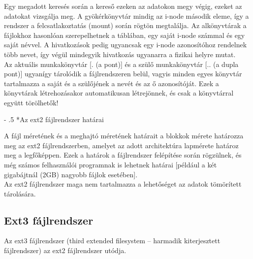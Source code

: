 \documentclass[tikz,12pt,margin=0px]{article}
\makeatletter
\renewcommand\paragraph{%
	\@startsection{paragraph}{4}{0mm}%
	{-\baselineskip}%
	{.5\baselineskip}%
	{\normalfont\normalsize\bfseries}}
\makeatother
\begin{document}
    \noindent Egy megadott keresés során a kereső ezeken az adatokon megy végig, ezeket az adatokat vizsgálja meg. A gyökérkönyvtár mindig az i-node második eleme, így a rendszer a felcsatlakoztatás (mount) során rögtön megtalálja. Az alkönyvtárak a fájlokhoz hasonlóan szerepelhetnek a táblában, egy saját i-node számmal és egy saját névvel. A hivatkozások pedig ugyancsak egy i-node azonosítóhoz rendelnek több nevet, így végül mindegyik hivatkozás ugyanarra a fizikai helyre mutat.\\

    \noindent Az aktuális munkakönyvtár [. (a pont)] és a szülő munkakönyvtár [.. (a dupla pont)] ugyanígy tárolódik a fájlrendszeren belül, vagyis minden egyes könyvtár tartalmazza a saját és a szülőjének a nevét és az ő azonosítóját. Ezek a könyvtárak létrehozásakor automatikusan létrejönnek, és csak a könyvtárral együtt törölhetők!

    \paragraph*{Az ext2 fájlrendszer határai}

    \noindent A fájl méretének és a meghajtó méretének határait a blokkok mérete határozza meg az ext2 fájlrendszerben, amelyet az adott architektúra lapmérete határoz meg a legfőképpen. Ezek a határok a fájlrendszer felépítése során rögzülnek, és még számos felhasználói programnak is lehetnek határai [például a két gigabájtnál (2GB) nagyobb fájlok esetében].\\

    \noindent Az ext2 fájlrendszer maga nem tartalmazza a lehetőséget az adatok tömörített tárolására.

    \subsection*{Ext3 fájlrendszer}

    \noindent Az ext3 fájlrendszer (third extended filesystem – harmadik kiterjesztett fájlrendszer) az ext2 fájlrendszer utódja.
\end{document}
